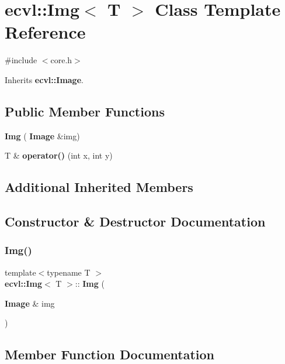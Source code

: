 \section{ecvl\+::Img$<$ T $>$ Class Template Reference}
\label{classecvl_1_1_img}


{\ttfamily \#include $<$core.\+h$>$}



Inherits \textbf{ ecvl\+::\+Image}.

\subsection*{Public Member Functions}
\begin{DoxyCompactItemize}
\item 
\textbf{ Img} (\textbf{ Image} \&img)
\item 
T \& \textbf{ operator()} (int x, int y)
\end{DoxyCompactItemize}
\subsection*{Additional Inherited Members}


\subsection{Constructor \& Destructor Documentation}
\mbox{\label{classecvl_1_1_img_ad9378aac3f1a5dca5883e8cb75a9bd67}} 
\subsubsection{Img()}
{\footnotesize\ttfamily template$<$typename T $>$ \\
\textbf{ ecvl\+::\+Img}$<$ T $>$\+::\textbf{ Img} (\begin{DoxyParamCaption}\item[{\textbf{ Image} \&}]{img }\end{DoxyParamCaption})\hspace{0.3cm}{\ttfamily [inline]}}



\subsection{Member Function Documentation}
\mbox{\label{classecvl_1_1_img_a7381b98851a54ef336f4498ebca0aff5}} 
